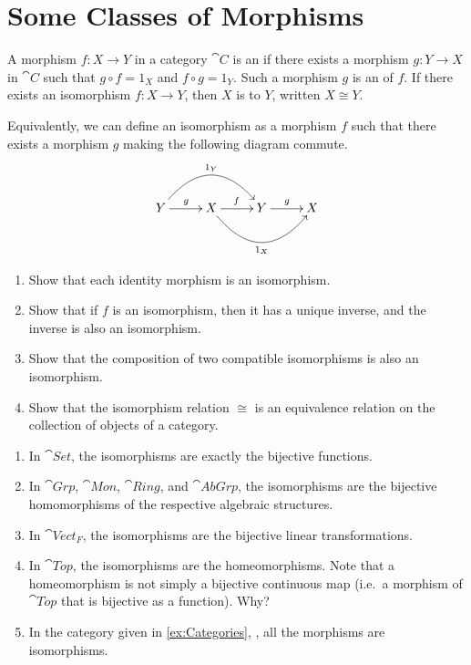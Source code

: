 \section{Some Classes of Morphisms}\label{sec:MorphismClasses}

A morphism $f \colon X \to Y$ in a category $\cat C$ is an  if there exists a morphism $g \colon Y \to X$ in $\cat C$ such that $g \circ f = 1_X$ and $f \circ g = 1_Y$. Such a morphism $g$ is an  of $f$. If there exists an isomorphism $f \colon X \to Y$, then $X$ is  to $Y$, written $X \cong Y$.

Equivalently, we can define an isomorphism as a morphism $f$ such that there exists a morphism $g$ making the following diagram commute.
\begin{equation*}
\xymatrix@C=2.5em{
Y \ar[r]^g \ar@/^2.2pc/[rr]^{1_Y} & X \ar[r]^f \ar@/_2.2pc/[rr]_{1_X} & Y \ar[r]^g & X
}
\end{equation*}

\begin{Exercise}
\begin{enumerate}
\item Show that each identity morphism is an isomorphism.
\item Show that if $f$ is an isomorphism, then it has a unique inverse, and the inverse is also an isomorphism.
\item Show that the composition of two compatible isomorphisms is also an isomorphism.
\item Show that the isomorphism relation $\cong$ is an equivalence relation on the collection of objects of a category.
\end{enumerate}
\end{Exercise}

\begin{Example}
\begin{enumerate}
\item In $\cat{Set}$, the isomorphisms are exactly the bijective functions.
\item In $\cat{Grp}$, $\cat{Mon}$, $\cat{Ring}$, and $\cat{AbGrp}$, the isomorphisms are the bijective homomorphisms of the respective algebraic structures.
\item In $\cat{Vect}_F$, the isomorphisms are the bijective linear transformations.
\item In $\cat{Top}$, the isomorphisms are the homeomorphisms. Note that a homeomorphism is not simply a bijective continuous map (i.e.\ a morphism of $\cat{Top}$ that is bijective as a function). Why?
\item In the category given in \cref{ex:Categories}, , all the morphisms are isomorphisms.
\end{enumerate}
\end{Example}

